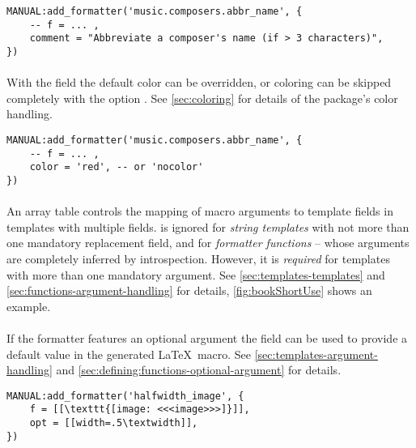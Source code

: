 \documentclass[12pt]{scrartcl}
\begin{document}
\begin{verbatim}
MANUAL:add_formatter('music.composers.abbr_name', {
	-- f = ... ,
	comment = "Abbreviate a composer's name (if > 3 characters)",
})
\end{verbatim}


\paragraph{}

With the  field the default color can be overridden, or coloring
can be skipped completely with the option .  See
\vref{sec:coloring} for details of the package's color handling.

\begin{verbatim}
MANUAL:add_formatter('music.composers.abbr_name', {
	-- f = ... ,
	color = 'red', -- or 'nocolor'
})
\end{verbatim}


\paragraph{}

An array table  controls the mapping of macro arguments to template
fields in templates with multiple fields.   is ignored for \emph{string templates} with not more than one mandatory replacement field, and for \emph{formatter functions} -- whose arguments are completely inferred by
introspection.  However, it is \emph{required} for templates with more than one mandatory argument.  See \vref{sec:templates-templates} and
\vref{sec:functions-argument-handling} for details, \vref{fig:bookShortUse} shows an example.


\paragraph{}

If the formatter features an optional argument the  field can be
used to provide a default value in the generated \LaTeX\ macro.  See
\vref{sec:templates-argument-handling} and
\vref{sec:defining:functions-optional-argument} for details.

\begin{verbatim}
MANUAL:add_formatter('halfwidth_image', {
	f = [[\texttt{[image: <<<image>>>]}]],
	opt = [[width=.5\textwidth]],
})
\end{verbatim}
\end{document}
